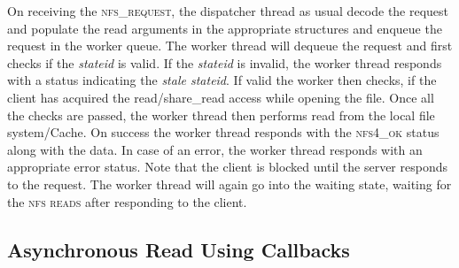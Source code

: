On receiving the \textsc{nfs\_request}, the dispatcher thread as usual decode the request and populate the read arguments in the appropriate structures and enqueue the request in the worker queue. The worker thread will dequeue the request and first checks if the \textit{stateid} is valid. If the \textit{stateid} is invalid, the worker thread responds with a status indicating the \textit{stale stateid}. If valid the worker then checks, if the client has acquired the read/share\_read access while opening the file. Once all the checks are passed, the worker thread then performs read from the local file system/Cache. On success the worker thread responds with the \textsc{nfs4\_ok} status along with the data. In case of an error, the worker thread responds with an appropriate error status. Note that the client is blocked until the server responds to the request. The worker thread will again go into the waiting state, waiting for the \textsc{nfs reads} after responding to the client.


\subsection{Asynchronous Read Using Callbacks}

